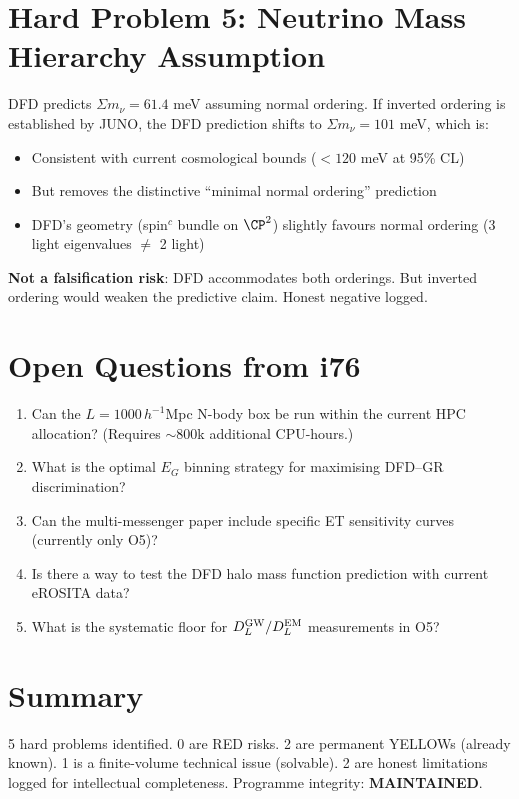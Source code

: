 \documentclass[11pt,a4paper]{article}
\begin{document}
\section{Hard Problem 5: Neutrino Mass Hierarchy Assumption}

DFD predicts $\Sigma m_\nu = 61.4$ meV assuming normal ordering. If inverted ordering is established by JUNO, the DFD prediction shifts to $\Sigma m_\nu = 101$ meV, which is:
\begin{itemize}[nosep]
\item Consistent with current cosmological bounds ($< 120$ meV at 95\% CL)
\item But removes the distinctive ``minimal normal ordering'' prediction
\item DFD's geometry (spin$^c$ bundle on $\CP^2$) slightly favours normal ordering (3 light eigenvalues $\neq$ 2 light)
\end{itemize}

\textbf{Not a falsification risk}: DFD accommodates both orderings. But inverted ordering would weaken the predictive claim. Honest negative logged.

\section{Open Questions from i76}

\begin{enumerate}[nosep]
\item Can the $L = 1000\,h^{-1}$Mpc N-body box be run within the current HPC allocation? (Requires $\sim 800$k additional CPU-hours.)
\item What is the optimal $E_G$ binning strategy for maximising DFD--GR discrimination?
\item Can the multi-messenger paper include specific ET sensitivity curves (currently only O5)?
\item Is there a way to test the DFD halo mass function prediction with current eROSITA data?
\item What is the systematic floor for $D_L^{\rm GW}/D_L^{\rm EM}$ measurements in O5?
\end{enumerate}

\section{Summary}

5 hard problems identified. 0 are RED risks. 2 are permanent YELLOWs (already known). 1 is a finite-volume technical issue (solvable). 2 are honest limitations logged for intellectual completeness. Programme integrity: \textbf{MAINTAINED}.
\end{document}
